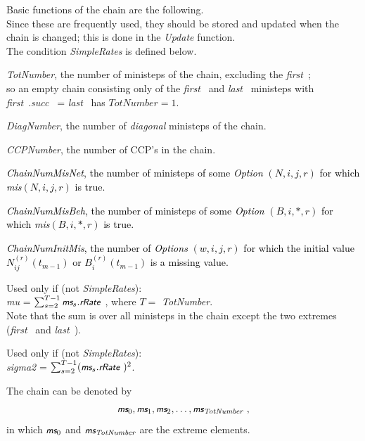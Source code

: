 \documentclass[a4paper,12pt,fleqn]{article}
\newcommand{\nnm}[1]{\textsf{\small\textit{#1}\ }}
\newcommand{\ms}{\textsl{\textsf{\small ms}}} %
\newcommand{\adda}[1]{{#1}}  %
\newcommand{\addaa}[1]{{\textcolor[named]{Black}{#1}}}  %
\newcommand{\addab}[1]{{\textcolor[named]{Black}{#1}}}  %
\begin{document}
Basic functions of the chain are the following.\\
\adda{Since these are frequently used, they should be stored
and updated when the chain is changed; this is done in the \textit{Update} function.}\\
\adda{The condition \textit{SimpleRates} is defined below.}
\begin{enumerate}
\item \textit{TotNumber}, the number of ministeps of the chain, excluding the \nnm{first};\\
      so an empty chain consisting only of the \nnm{first} and \nnm{last} ministeps
      with \\
      \nnm{first}.\nnm{succ} = \nnm{last} has $\textit{TotNumber} = 1$.
\item \textit{DiagNumber}, the number of \textit{diagonal} ministeps of the chain.
\item \textit{CCPNumber}, the number of CCP's in the chain.
\addaa{
\item \textit{ChainNumMisNet}, the number of ministeps of
     some  \textit{Option} $(N,i,j,r)$ for which \textit{mis}$(N,i,j,r)$ is true.
\item \textit{ChainNumMisBeh}, the number of ministeps of
     some  \textit{Option} $(B,i,*,r)$ for which \textit{mis}$(B,i,*,r)$ is true.
}
\addab{
\item \textit{ChainNumInitMis}, the number of
     \textit{Options} $(w,i,j,r)$ for which
     the initial value $N_{ij}^{(r)}(t_{m-1})$
     or $B_{i}^{(r)}(t_{m-1})$ is a missing value.
}
\adda{
\item Used only if (not \textit{SimpleRates}):\\
      \textit{mu} = $\sum_{s=2}^{T-1} \ms_s.\nnm{rRate}$, where $T = $ \textit{TotNumber}.\\
      Note that the sum is over all ministeps in the chain except the two extremes
      (\nnm{first} and \nnm{last}).
\item Used only if (not \textit{SimpleRates}):\\
      \textit{sigma2} = $\sum_{s=2}^{T-1} (\ms_s.\nnm{rRate})^2$.
}
\end{enumerate}
\adda{The chain can be denoted by
\[
  \ms_0, \ms_1, \ms_2, \ldots, \ms_\textit{TotNumber} \ ,
\]
in which $\ms_0$ and $\ms_\textit{TotNumber}$ are the extreme elements.
}
\end{document}
